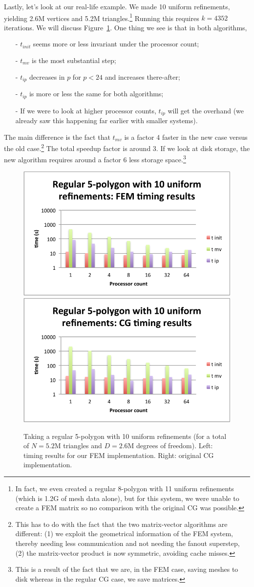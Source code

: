 \documentclass[11pt]{amsart}
\theoremstyle{definition}
\begin{document}
Lastly, let's look at our real-life example. We made 10 uniform refinements, yielding 2.6M vertices and 5.2M triangles.\footnote{In fact, we even created a regular 8-polygon with 11 uniform refinements (which is 1.2G of mesh data alone), but for this system, we were unable to create a FEM matrix so no comparison with the original CG was possible.} Running this requires $k=4352$ iterations. We will discuss Figure~\ref{fig:baazen}. One thing we see is that in both algorithms, 
\begin{itemize}
  \item[-] $t_{init}$ seems more or less invariant under the processor count; 
  \item[-] $t_{mv}$ is the most substantial step;
  \item[-] $t_{ip}$ decreases in $p$ for $p < 24$ and increases there-after;
  \item[-] $t_{ip}$ is more or less the same for both algorithms;
  \item[-] If we were to look at higher processor counts, $t_{ip}$ will get the overhand (we already saw this happening far earlier with smaller systems).
\end{itemize}
The main difference is the fact that $t_{mv}$ is a factor 4 faster in the new case versus the old case.\footnote{This has to do with the fact that the two matrix-vector algorithms are different: (1) we exploit the geometrical information of the FEM system, thereby needing less communication and not needing the fanout superstep, (2) the matrix-vector product is now symmetric, avoiding cache misses.} The total speedup factor is around 3. If we look at disk storage, the new algorithm requires around a factor 6 less storage space.\footnote{This is a result of the fact that we are, in the FEM case, saving meshes to disk whereas in the regular CG case, we save matrices.}

\begin{figure}
  \includegraphics[width=0.48\linewidth]{baazen_fem.pdf}
  \includegraphics[width=0.48\linewidth]{baazen_cg.pdf}
  \caption{Taking a regular 5-polygon with 10 uniform refinements (for a total of $N = 5.2$M triangles and $D = 2.6$M degrees of freedom). Left: timing results for our FEM implementation. Right: original CG implementation.}
  \label{fig:baazen}
\end{figure}
\end{document}
